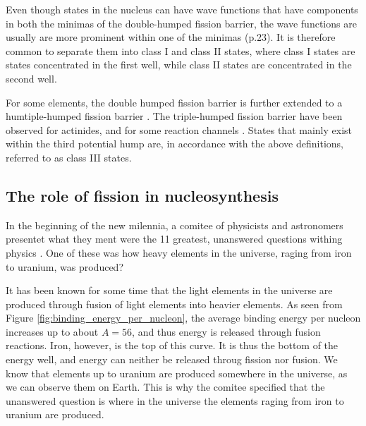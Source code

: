 \documentclass[]{article}
\begin{document}
\par
\vspace{3mm}

\noindent Even though states in the nucleus can have wave functions that have components in both the minimas of the double-humped fission barrier, the wave functions are usually are more prominent within one of the minimas \cite{Wagemans1991} (p.23). It is therefore common to separate them into class I and class II states, where class I states are states concentrated in the first well, while class II states are concentrated in the second well. 

\par 
\vspace{3mm}

 \noindent For some elements, the double humped fission barrier is further extended to a humtiple-humped fission barrier \cite{Goriely2017}. The triple-humped fission barrier have been observed for actinides, and for some reaction channels \cite{PhysRevC.74.014608}. States that mainly exist within the third potential hump are, in accordance with the above definitions, referred to as class III states. 
 
\subsection{The role of fission in nucleosynthesis}
\label{fission_in_astro}
 \noindent In the beginning of the new milennia, a comitee of physicists and astronomers presentet what they ment were the 11 greatest, unanswered questions withing physics \cite{Haseltine2002}. One of these was how heavy elements in the universe, raging from iron to uranium, was produced?

\par 
\vspace{3mm}
\noindent It has been known for some time that the light elements in the universe are produced through fusion of light elements into heavier elements. As seen from Figure \ref{fig:binding_energy_per_nucleon}, the average binding energy per nucleon increases up to about $A = 56$, and thus energy is released through fusion reactions. Iron, however, is the top of this curve. It is thus the bottom of the energy well, and energy can neither be released throug fission nor fusion. We know that elements up to uranium are produced somewhere in the universe, as we can observe them on Earth. This is why the comitee specified that the unanswered question is where in the universe the elements raging from iron to uranium are produced. 
\end{document}
